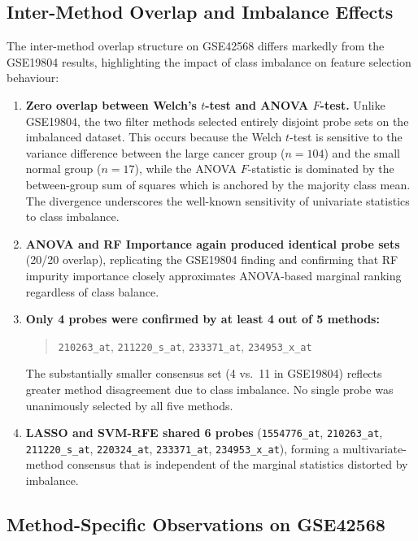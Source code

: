 \subsection{Inter-Method Overlap and Imbalance Effects}

The inter-method overlap structure on GSE42568 differs markedly from the GSE19804 results, highlighting the impact of class imbalance on feature selection behaviour:

\begin{enumerate}
    \item \textbf{Zero overlap between Welch's $t$-test and ANOVA $F$-test.} Unlike GSE19804, the two filter methods selected entirely disjoint probe sets on the imbalanced dataset. This occurs because the Welch $t$-test is sensitive to the variance difference between the large cancer group ($n=104$) and the small normal group ($n=17$), while the ANOVA $F$-statistic is dominated by the between-group sum of squares which is anchored by the majority class mean. The divergence underscores the well-known sensitivity of univariate statistics to class imbalance.

    \item \textbf{ANOVA and RF Importance again produced identical probe sets} (20/20 overlap), replicating the GSE19804 finding and confirming that RF impurity importance closely approximates ANOVA-based marginal ranking regardless of class balance.

    \item \textbf{Only 4 probes were confirmed by at least 4 out of 5 methods:}
    \begin{quote}
    \texttt{210263\_at}, \texttt{211220\_s\_at}, \texttt{233371\_at}, \texttt{234953\_x\_at}
    \end{quote}
    The substantially smaller consensus set (4 vs.\ 11 in GSE19804) reflects greater method disagreement due to class imbalance. No single probe was unanimously selected by all five methods.

    \item \textbf{LASSO and SVM-RFE shared 6 probes} (\texttt{1554776\_at}, \texttt{210263\_at}, \texttt{211220\_s\_at}, \texttt{220324\_at}, \texttt{233371\_at}, \texttt{234953\_x\_at}), forming a multivariate-method consensus that is independent of the marginal statistics distorted by imbalance.
\end{enumerate}

\subsection{Method-Specific Observations on GSE42568}

